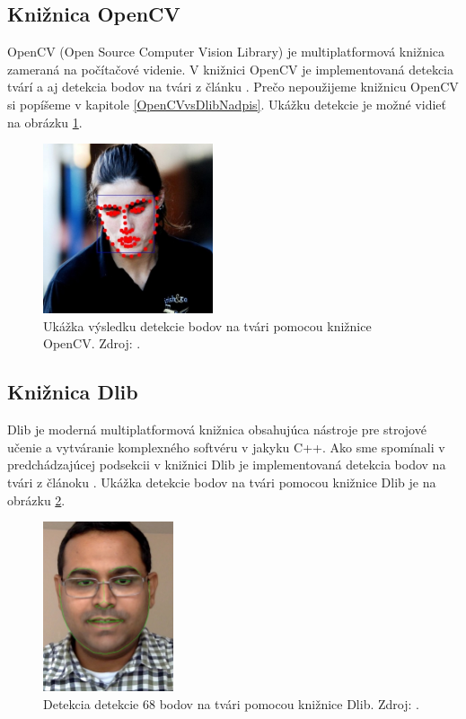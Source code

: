 \subsection{Knižnica OpenCV}
OpenCV\cite{openCv} (Open Source Computer Vision Library) je multiplatformová knižnica zameraná na počítačové videnie.
V knižnici OpenCV je implementovaná detekcia tvárí a aj detekcia bodov na tvári z článku \cite{kazemi2014one}. 
Prečo nepoužijeme knižnicu OpenCV si popíšeme v kapitole \ref{OpenCVvsDlibNadpis}. 
Ukážku detekcie je možné vidieť na obrázku \ref{pic-openCv}. 

\begin{figure}[H]
	\begin{center}
		\includegraphics[height=5cm]{pics/openCv.jpg}
		\caption{Ukážka výsledku detekcie bodov na tvári pomocou knižnice OpenCV.
		Zdroj: \cite{openCv}.}
		\label{pic-openCv}
	\end{center}
\end{figure}

\subsection{Knižnica Dlib} \label{DlibNadpis}
Dlib\cite{dlib} je moderná multiplatformová knižnica obsahujúca nástroje pre strojové učenie a vytváranie komplexného softvéru v jakyku C++. 
Ako sme spomínali v pred\-chá\-dza\-jú\-cej podsekcii v knižnici Dlib je implementovaná detekcia bodov na tvári z článoku \cite{kazemi2014one}. 
Ukážka detekcie bodov na tvári pomocou knižnice Dlib je na obrázku \ref{pic-dlibUkazka}.

\begin{figure}[H]
	\begin{center}
		\includegraphics[height=5cm]{pics/dlib.jpg}
		\caption{Detekcia detekcie 68 bodov na tvári pomocou knižnice Dlib.
		Zdroj: \cite{dlibUkazka}.}
		\label{pic-dlibUkazka}
	\end{center}
\end{figure}

